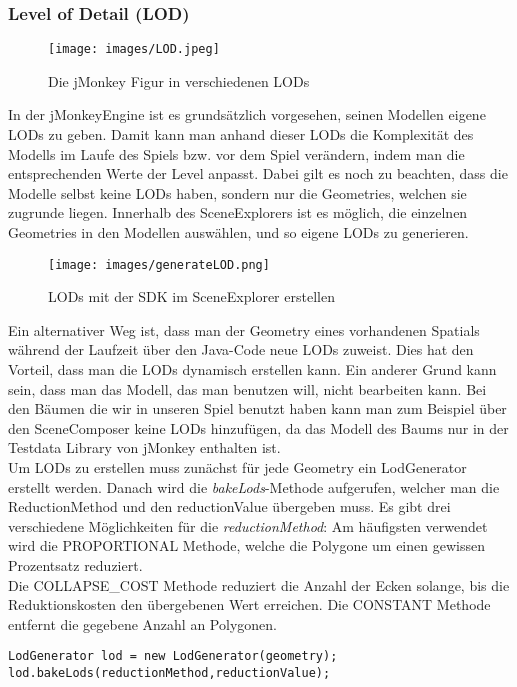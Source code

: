 \subsubsection{Level of Detail (LOD)}
\begin{figure}[h!]
	
	
	
	\centering\texttt{[image: images/LOD.jpeg]}
	\caption{Die jMonkey Figur in verschiedenen LODs}\cite{Abb10}
	
\end{figure}  
In der jMonkeyEngine ist es grundsätzlich vorgesehen, seinen Modellen eigene LODs zu geben. Damit kann man anhand dieser LODs die Komplexität des Modells im Laufe des Spiels bzw. vor dem Spiel verändern, indem man die entsprechenden Werte der Level anpasst. Dabei gilt es noch zu beachten, dass die Modelle selbst keine LODs haben, sondern nur die Geometries, welchen sie zugrunde liegen. Innerhalb des SceneExplorers ist es möglich, die einzelnen Geometries in den Modellen auswählen, und so eigene LODs zu generieren.\\
\begin{figure}[H]
	
	
	\centering\texttt{[image: images/generateLOD.png]}
	\caption{LODs mit der SDK im SceneExplorer erstellen}
	
\end{figure} 
Ein alternativer Weg ist, dass man der Geometry eines vorhandenen Spatials während der Laufzeit über den Java-Code neue LODs zuweist. Dies hat den Vorteil, dass man die LODs dynamisch erstellen kann. Ein anderer Grund kann sein, dass man das Modell, das man benutzen will, nicht bearbeiten kann. Bei den Bäumen die wir in unseren Spiel benutzt haben kann man zum Beispiel über den SceneComposer keine LODs hinzufügen, da das Modell des Baums nur in der Testdata Library von jMonkey enthalten ist. \\
Um LODs zu erstellen muss zunächst für jede Geometry ein LodGenerator erstellt werden. Danach wird die \emph{bakeLods}-Methode aufgerufen, welcher man die ReductionMethod und den reductionValue übergeben muss. Es gibt drei verschiedene Möglichkeiten für die \emph{reductionMethod}: Am häufigsten verwendet wird die PROPORTIONAL Methode, welche die Polygone um einen gewissen Prozentsatz reduziert. \\
Die COLLAPSE\_COST Methode reduziert die Anzahl der Ecken solange, bis die Reduktionskosten den übergebenen Wert erreichen. Die CONSTANT Methode entfernt die gegebene Anzahl an Polygonen.
\begin{lstlisting}
LodGenerator lod = new LodGenerator(geometry);
lod.bakeLods(reductionMethod,reductionValue);
\end{lstlisting}

